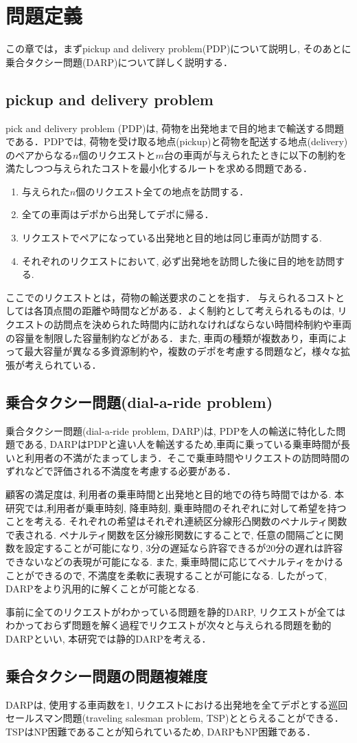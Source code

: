 \chapter{問題定義}\label{definition}
この章では，まずpickup and delivery problem(PDP)について説明し, そのあとに乗合タクシー問題(DARP)について詳しく説明する．
\section{pickup and delivery problem}
pick and delivery problem (PDP)は, 荷物を出発地まで目的地まで輸送する問題である．PDPでは, 荷物を受け取る地点(pickup)と荷物を配送する地点(delivery)のペアからなる$n$個のリクエストと$m$台の車両が与えられたときに以下の制約を満たしつつ与えられたコストを最小化するルートを求める問題である．
\begin{enumerate}
 \item 与えられた$n$個のリクエスト全ての地点を訪問する．
 \item 全ての車両はデポから出発してデポに帰る．
 \item リクエストでペアになっている出発地と目的地は同じ車両が訪問する.
 \item それぞれのリクエストにおいて, 必ず出発地を訪問した後に目的地を訪問する.
\end{enumerate}
ここでのリクエストとは，荷物の輸送要求のことを指す．
与えられるコストとしては各頂点間の距離や時間などがある．よく制約として考えられるものは, リクエストの訪問点を決められた時間内に訪れなければならない時間枠制約や車両の容量を制限した容量制約などがある．また, 車両の種類が複数あり，車両によって最大容量が異なる多資源制約や，複数のデポを考慮する問題など，様々な拡張が考えられている．

\section{乗合タクシー問題(dial-a-ride problem)}
乗合タクシー問題(dial-a-ride problem, DARP)は, PDPを人の輸送に特化した問題である, DARPはPDPと違い人を輸送するため,車両に乗っている乗車時間が長いと利用者の不満がたまってしまう．そこで乗車時間やリクエストの訪問時間のずれなどで評価される不満度を考慮する必要がある．

顧客の満足度は, 利用者の乗車時間と出発地と目的地での待ち時間ではかる. 本研究では,利用者が乗車時刻, 降車時刻, 乗車時間のそれぞれに対して希望を持つことを考える. それぞれの希望はそれぞれ連続区分線形凸関数のペナルティ関数で表される. ペナルティ関数を区分線形関数にすることで, 任意の間隔ごとに関数を設定することが可能になり, 3分の遅延なら許容できるが20分の遅れは許容できないなどの表現が可能になる. また, 乗車時間に応じてペナルティをかけることができるので, 不満度を柔軟に表現することが可能になる. したがって, DARPをより汎用的に解くことが可能となる.

事前に全てのリクエストがわかっている問題を静的DARP, リクエストが全てはわかっておらず問題を解く過程でリクエストが次々と与えられる問題を動的DARPといい, 本研究では静的DARPを考える．

\section{乗合タクシー問題の問題複雑度}
DARPは, 使用する車両数を1, リクエストにおける出発地を全てデポとする巡回セールスマン問題(traveling salesman problem, TSP)ととらえることができる．TSPはNP困難\cite{TSP}であることが知られているため, DARPもNP困難である．
